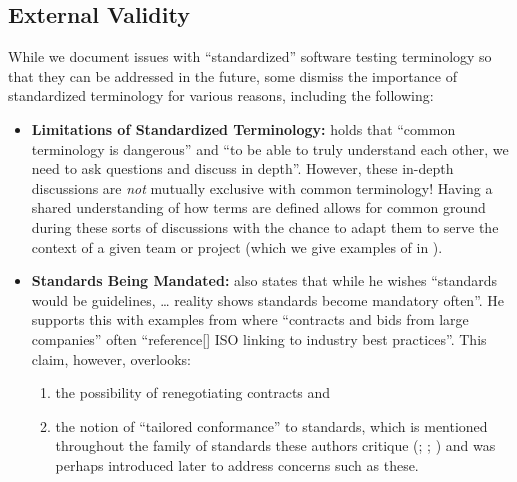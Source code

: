 \subsection{External Validity}\label{exter-valid}
While we document issues with
``standardized'' software testing terminology so that they can be addressed in
the future, some dismiss the importance of standardized terminology for various
reasons, including the following:
\begin{itemize}
    \item \textbf{Limitations of Standardized Terminology:} \citet{Schoots2014}
          holds that ``common terminology is dangerous'' and ``to be able to
          truly understand each other, we need to ask questions and discuss in
          depth''. However, these in-depth discussions are \emph{not} mutually
          exclusive with common terminology! Having a shared understanding of
          how terms are defined allows for common ground during these sorts of
          discussions with the chance to adapt them to serve the context of a
          given team or project (which we give examples of in
          ).
    \item \textbf{Standards Being Mandated:} \citet{Schoots2014} also states
          that while he wishes ``standards would be guidelines, \dots{} reality
          shows standards become mandatory often''. He supports this with
          examples from \citet{Soundararajan2015} where ``contracts and bids
          from large companies'' often ``reference[] ISO linking to industry
          best practices''. This claim, however, overlooks:
          \begin{enumerate}
              \item the possibility of renegotiating contracts and
              \item the notion of ``tailored conformance'' to standards, which
                    is mentioned throughout the family of standards these
                    authors critique (\citealp[pp.~9\=/10]{IEEE2021a};
                    \citeyear[pp.~5, 17, 37]{IEEE2021b};
                    \citeyear[p.~7]{IEEE2021c}) and was perhaps
                    introduced later to address concerns such as these.
          \end{enumerate}
\end{itemize}

